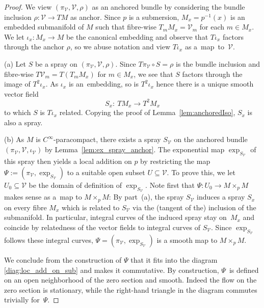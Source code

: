 \documentclass[pdftex]{sigma}
\numberwithin{equation}{section}
\newcommand{\cV}{\ensuremath{\mathcal{V}}}
\begin{document}
\begin{proof} We view $(\pi_{\cV},\cV,\rho)$ as an anchored bundle by considering the bundle inclusion ${\rho \colon\! \cV \!\rightarrow\! TM}$ as anchor. Since $p$ is a submersion, $M_x= p^{-1}(x)$ is an embedded submanifold of $M$ such that fibre-wise $T_m M_x = \cV_m$ for each $m \in M_x$. We let $\iota_x \colon M_x \rightarrow M$ be the canonical embedding and observe that $T\iota_x$ factors through the anchor $\rho$, so we abuse notation and view $T\iota_x$ as a~map~to~$\cV$.

(a) Let $S$ be a spray on $(\pi_\cV, \cV, \rho)$. Since $T\pi_\cV \circ S = \rho$ is the bundle inclusion and fibre-wise $T\cV_m = T(T_m M_x)$ for $m \in M_x$, we see that $S$ factors through the image of $T^2 \iota_x$.
As $\iota_x$ is an~embedding, so is $T^2\iota_x$ hence there is a unique smooth vector field
\begin{displaymath}S_x \colon\ T M_x \rightarrow T^2M_x\end{displaymath}
to which $S$ is $T\iota_x$ related. Copying the proof of Lemma~\ref{lem:anchoredIso}, $S_x$ is also a spray.

(b) As $M$ is $C^\infty$-paracompact, there exists a spray $S_\cV$ on the anchored bundle $(\pi_\cV,\cV,\iota_{\cV})$ by Lemma~\ref{lem:ex_spray_anchor}.
The exponential map $\exp_{S_\cV}$ of this spray then yields a local addition on $p$ by restricting the map $\Psi := (\pi_{\cV}, \exp_{S_\cV})$ to a suitable open subset $U \subseteq \mathcal{V}$. To prove this, we let~${U_{0} \subseteq \mathcal{V}}$ be the domain of definition of $\exp_{S_{\cV}}$.
Note first that $\Psi \colon U_{0} \rightarrow M \times_p M$ makes sense as a~map to $M \times_p M$: By part~(a), the spray $S_\cV$ induces a spray $S_x$ on every fibre $M_x$ which is related to $S_\cV$ via the (tangent of the) inclusion of the submanifold. In particular, integral curves of the induced spray stay on~$M_x$ and coincide by relatedness of the vector fields to integral curves of $S_\cV$. Since $\exp_{S_\cV}$ follows these integral curves, $\Psi= (\pi_{\cV},\exp_{S_\cV})$ is a smooth map to $M\times_p M$.

We conclude from the construction of $\Psi$ that it fits into the diagram \eqref{diag:loc_add_on_sub} and makes it commutative. By construction, $\Psi$~is defined on an open neighborhood of the zero section and smooth. Indeed the flow on the zero section is stationary, while the right-hand triangle in the diagram commutes trivially for~$\Psi$.


\end{proof}
\end{document}
